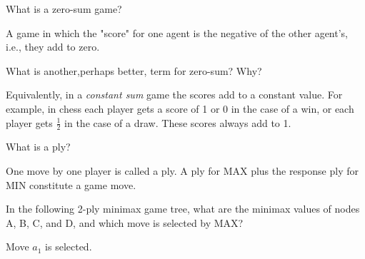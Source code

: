 \begin{questions}

\question What is a zero-sum game?

\begin{solution}[1in]
A game in which the "score" for one agent is the negative of the other agent's, i.e., they add to zero.
\end{solution}

\question What is another,perhaps better, term for zero-sum?  Why?

\begin{solution}[1in]
Equivalently, in a {\it constant sum} game the scores add to a constant value.  For example, in chess each player gets a score of 1 or 0 in the case of a win, or each player gets $\frac{1}{2}$ in the case of a draw.  These scores always add to 1.
\end{solution}

\question What is a ply?

\begin{solution}[1in]
One move by one player is called a ply.  A ply for MAX plus the response ply for MIN constitute a game move.
\end{solution}

\question In the following 2-ply minimax game tree, what are the minimax values of nodes A, B, C, and D, and which move is selected by MAX?

\ifprintanswers

Move $a_1$ is selected.

\end{questions}
